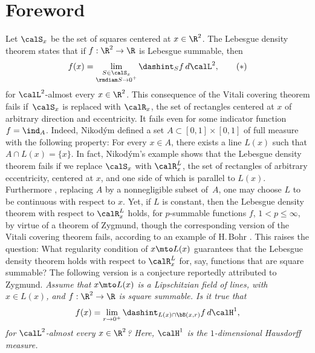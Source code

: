 \section{Foreword}

Let $\calS_x$ be the set of squares centered at $x \in \R^2$.
The Lebesgue density theorem states that if $f: \R^2 \to \R$ is Lebesgue summable, then\vspace*{-3pt}
\begin{equation}
\label{eq.intro}
f(x) = \lim_{\substack{S \in \calS_x\\\rmdiam S \to 0^+}} \dashint_S f \,d\calL^2,\tag{$*$}
\end{equation}
for $\calL^2$-almost every $x \in \R^2$.
This consequence of the Vitali covering theorem fails if~$\calS_x$ is replaced with $\calR_x$, the set of rectangles centered at $x$ of arbitrary direction and eccentricity.
It fails even for some indicator function $f = \ind_A$.
Indeed, Nikod\'ym \cite{NIK.27} defined a set $A \subset [0,1] \times [0,1]$ of full measure with the following property: For every $x \in A$, there exists a line $L(x)$ such that $A \cap L(x) = \{x\}$.
In fact, Nikod\'ym's example shows that the Lebesgue density theorem fails if we replace $\calS_x$ with $\calR_x^L$, the set of rectangles of arbitrary eccentricity, centered at $x$, and one side of which is parallel to $L(x)$.
Furthermore \cite[Chap.\,IV, Th.\,3.5]{GUZMAN.1981}, replacing $A$ by a nonnegligible subset of~$A$, one may choose $L$ to be continuous with respect to $x$.
Yet, if $L$ is constant, then the Lebesgue density theorem with respect to $\calR_x^L$ holds, for $p$-summable functions $f$, $1 < p \leq \infty$, by virtue of a theorem of Zygmund, though the corresponding version of the Vitali covering theorem fails, according to an example of H.\,Bohr \cite[Chap.\,IV, Th.\,1.1]{GUZMAN.1981}.
This raises the question: What regularity condition of $x \mto L(x)$ guarantees that the Lebesgue density theorem holds with respect to $\calR_x^L$ for, say, functions that are square summable?
The following version is a conjecture reportedly \cite{LAC.LI.10} attributed to Zygmund.
{\it
Assume that $x \mto L(x)$ is a Lipschitzian field of lines, with $x \in L(x)$, and $f: \R^2 \to \R$ is square summable.
Is it true that\vspace*{-3pt}
\begin{equation*}
f(x) = \lim_{r \to 0^+} \dashint_{L(x) \cap \bB(x,r)} f \,d\calH^1,
\end{equation*}
for $\calL^2$-almost every $x \in \R^2$?
Here, $\calH^1$ is the $1$-dimensional Hausdorff measure.
}
